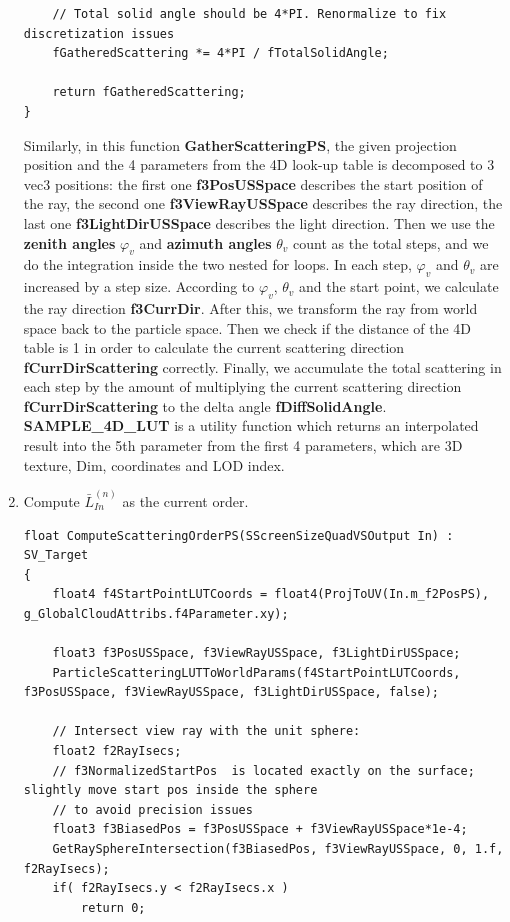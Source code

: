 \begin{enumerate}
\begin{lstlisting}
    // Total solid angle should be 4*PI. Renormalize to fix discretization issues
    fGatheredScattering *= 4*PI / fTotalSolidAngle;

    return fGatheredScattering;
}
\end{lstlisting}
Similarly, in this function \textbf{GatherScatteringPS}, the given projection position and the 4 parameters from the 4D look-up table is decomposed to 3 vec3 positions: the first one \textbf{f3PosUSSpace} describes the start position of the ray, the second one \textbf{f3ViewRayUSSpace} describes the ray direction, the last one \textbf{f3LightDirUSSpace} describes the light direction. Then we use the \textbf{zenith angles} $\varphi_v$ and \textbf{azimuth angles} $\theta_v$ count as the total steps, and we do the integration inside the two nested for loops. In each step, $\varphi_v$ and $\theta_v$ are increased by a step size. According to $\varphi_v$, $\theta_v$ and the start point, we calculate the ray direction \textbf{f3CurrDir}. After this, we transform the ray from world space back to the particle space. Then we check if the distance of the 4D table is 1 in order to calculate the current scattering direction \textbf{fCurrDirScattering} correctly. Finally, we accumulate the total scattering in each step by the amount of multiplying the current scattering direction \textbf{fCurrDirScattering} to the delta angle \textbf{fDiffSolidAngle}.\\
\textbf{SAMPLE\_4D\_LUT} is a utility function which returns an interpolated result into the 5th parameter from the first 4 parameters, which are 3D texture, Dim, coordinates and LOD index.


\item Compute $\bar{L}_{In}^{(n)}$ as the current order.
\begin{lstlisting}
float ComputeScatteringOrderPS(SScreenSizeQuadVSOutput In) : SV_Target
{
    float4 f4StartPointLUTCoords = float4(ProjToUV(In.m_f2PosPS), g_GlobalCloudAttribs.f4Parameter.xy);

    float3 f3PosUSSpace, f3ViewRayUSSpace, f3LightDirUSSpace;
    ParticleScatteringLUTToWorldParams(f4StartPointLUTCoords, f3PosUSSpace, f3ViewRayUSSpace, f3LightDirUSSpace, false);

    // Intersect view ray with the unit sphere:
    float2 f2RayIsecs;
    // f3NormalizedStartPos  is located exactly on the surface; slightly move start pos inside the sphere
    // to avoid precision issues
    float3 f3BiasedPos = f3PosUSSpace + f3ViewRayUSSpace*1e-4;
    GetRaySphereIntersection(f3BiasedPos, f3ViewRayUSSpace, 0, 1.f, f2RayIsecs);
    if( f2RayIsecs.y < f2RayIsecs.x )
        return 0;


\end{lstlisting}
\end{enumerate}
